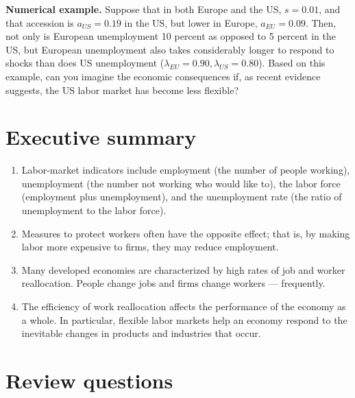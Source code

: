 \textbf{Numerical example.} Suppose that in both Europe and the US, $s=0.01$, and that accession is $a_{US}=0.19$  in the US, but lower in Europe, $a_{EU}=0.09$. Then, not only is European unemployment 10 percent as opposed to 5 percent in the US, but European unemployment also takes considerably longer to respond to shocks than does US unemployment ($\lambda_{EU}=0.90,\lambda_{US}=0.80$). Based on this example, can you imagine the economic consequences if, as recent evidence suggests, the US labor market has become less flexible?



\section*{Executive summary}

\setlength{\leftmargini}{.5\oldleftmargini}
\begin{enumerate}
\item Labor-market indicators include employment (the number of
people working), unemployment (the number not working who would
like to), the labor force (employment plus unemployment), and the
unemployment rate (the ratio of unemployment to the labor force).

\item Measures to protect workers often have the opposite effect; that is,
by making labor more expensive to firms, they may reduce employment.

\item Many developed economies are characterized by high rates of job
and worker reallocation. People change jobs and firms change
workers --- frequently.

\item The efficiency of work reallocation affects the performance
of the economy as a whole. In particular, flexible labor markets help an
economy respond to the inevitable changes in products and industries that occur.

\end{enumerate}
\setlength{\leftmargini}{\oldleftmargini}

\section*{Review questions}

